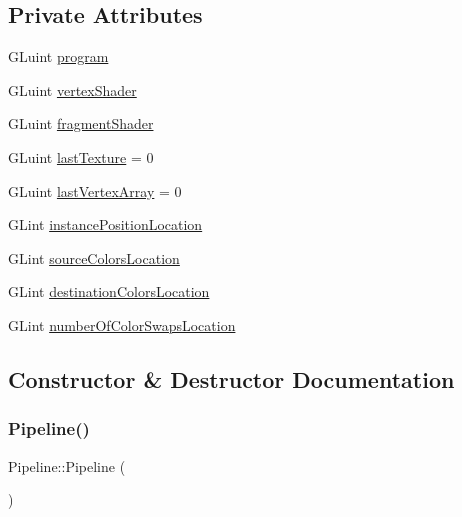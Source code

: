 \subsection*{Private Attributes}
\begin{DoxyCompactItemize}
\item 
G\+Luint \hyperlink{class_pipeline_a7f3b684d19d114d2a7cb54dc0e89c5f2}{program}
\item 
G\+Luint \hyperlink{class_pipeline_a7355b9ab47063a1cb683344113e964e3}{vertex\+Shader}
\item 
G\+Luint \hyperlink{class_pipeline_a91a4e7bf32b46b337e39b0436fa83faa}{fragment\+Shader}
\item 
G\+Luint \hyperlink{class_pipeline_acdf6fe161adcf4e4d39e66cba8873d01}{last\+Texture} = 0
\item 
G\+Luint \hyperlink{class_pipeline_ac16f368b971d6ed8c92dbb9824ee0cae}{last\+Vertex\+Array} = 0
\item 
G\+Lint \hyperlink{class_pipeline_a7aee16a3e8cb60299c175417c8dca531}{instance\+Position\+Location}
\item 
G\+Lint \hyperlink{class_pipeline_a8a126a8b85d4bbd1d1894ee2691478e5}{source\+Colors\+Location}
\item 
G\+Lint \hyperlink{class_pipeline_a0d3b7cf20e189c0489bf37f54dee7a37}{destination\+Colors\+Location}
\item 
G\+Lint \hyperlink{class_pipeline_a47013549f42fee9d082c3ec05f5288ed}{number\+Of\+Color\+Swaps\+Location}
\end{DoxyCompactItemize}


\subsection{Constructor \& Destructor Documentation}
\mbox{\label{class_pipeline_a79e49366358f823b8812658f8bf3a9e8}} 
\subsubsection{\texorpdfstring{Pipeline()}{Pipeline()}}
{\footnotesize\ttfamily Pipeline\+::\+Pipeline (\begin{DoxyParamCaption}{ }\end{DoxyParamCaption})}

\mbox{\label{class_pipeline_a527044d53a20f851d0579fbf313a2dec}} 
